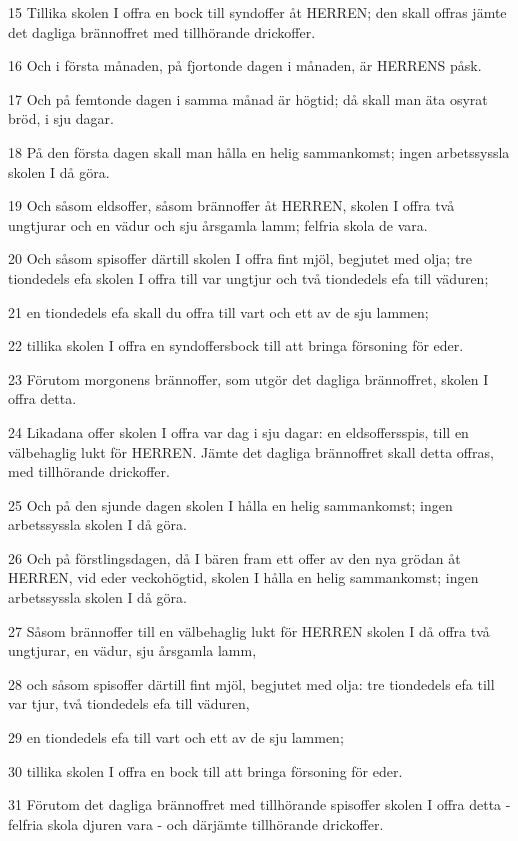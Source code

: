 \par 15 Tillika skolen I offra en bock till syndoffer åt HERREN; den skall offras jämte det dagliga brännoffret med tillhörande drickoffer.
\par 16 Och i första månaden, på fjortonde dagen i månaden, är HERRENS påsk.
\par 17 Och på femtonde dagen i samma månad är högtid; då skall man äta osyrat bröd, i sju dagar.
\par 18 På den första dagen skall man hålla en helig sammankomst; ingen arbetssyssla skolen I då göra.
\par 19 Och såsom eldsoffer, såsom brännoffer åt HERREN, skolen I offra två ungtjurar och en vädur och sju årsgamla lamm; felfria skola de vara.
\par 20 Och såsom spisoffer därtill skolen I offra fint mjöl, begjutet med olja; tre tiondedels efa skolen I offra till var ungtjur och två tiondedels efa till väduren;
\par 21 en tiondedels efa skall du offra till vart och ett av de sju lammen;
\par 22 tillika skolen I offra en syndoffersbock till att bringa försoning för eder.
\par 23 Förutom morgonens brännoffer, som utgör det dagliga brännoffret, skolen I offra detta.
\par 24 Likadana offer skolen I offra var dag i sju dagar: en eldsoffersspis, till en välbehaglig lukt för HERREN. Jämte det dagliga brännoffret skall detta offras, med tillhörande drickoffer.
\par 25 Och på den sjunde dagen skolen I hålla en helig sammankomst; ingen arbetssyssla skolen I då göra.
\par 26 Och på förstlingsdagen, då I bären fram ett offer av den nya grödan åt HERREN, vid eder veckohögtid, skolen I hålla en helig sammankomst; ingen arbetssyssla skolen I då göra.
\par 27 Såsom brännoffer till en välbehaglig lukt för HERREN skolen I då offra två ungtjurar, en vädur, sju årsgamla lamm,
\par 28 och såsom spisoffer därtill fint mjöl, begjutet med olja: tre tiondedels efa till var tjur, två tiondedels efa till väduren,
\par 29 en tiondedels efa till vart och ett av de sju lammen;
\par 30 tillika skolen I offra en bock till att bringa försoning för eder.
\par 31 Förutom det dagliga brännoffret med tillhörande spisoffer skolen I offra detta - felfria skola djuren vara - och därjämte tillhörande drickoffer.


